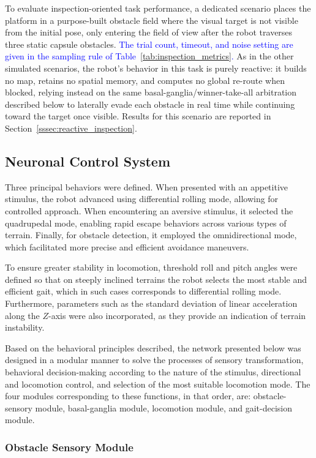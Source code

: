 \documentclass[preprint,12pt]{elsarticle}
\newcommand{\revblue}[1]{\textcolor{blue}{#1}}
\begin{document}
To evaluate inspection-oriented task performance, a dedicated scenario places the platform in a purpose-built obstacle field where the visual target is not visible from the initial pose, only entering the field of view after the robot traverses three static capsule obstacles. \revblue{The trial count, timeout, and noise setting are given in the sampling rule of Table~\ref{tab:inspection_metrics}.} As in the other simulated scenarios, the robot's behavior in this task is purely reactive: it builds no map, retains no spatial memory, and computes no global re-route when blocked, relying instead on the same basal-ganglia/winner-take-all arbitration described below to laterally evade each obstacle in real time while continuing toward the target once visible. Results for this scenario are reported in Section~\ref{sssec:reactive_inspection}.

\subsection{Neuronal Control System}

Three principal behaviors were defined. When presented with an appetitive stimulus, the robot advanced using differential rolling mode, allowing for controlled approach. When encountering an aversive stimulus, it selected the quadrupedal mode, enabling rapid escape behaviors across various types of terrain. Finally, for obstacle detection, it employed the omnidirectional mode, which facilitated more precise and efficient avoidance maneuvers. 

To ensure greater stability in locomotion, threshold roll and pitch angles were defined so that on steeply inclined terrains the robot selects the most stable and efficient gait, which in such cases corresponds to differential rolling mode. Furthermore, parameters such as the standard deviation of linear acceleration along the $Z$-axis were also incorporated, as they provide an indication of terrain instability.  

Based on the behavioral principles described, the network presented below was designed in a modular manner to solve the processes of sensory transformation, behavioral decision-making according to the nature of the stimulus, directional and locomotion control, and selection of the most suitable locomotion mode. The four modules corresponding to these functions, in that order, are: obstacle-sensory module, basal-ganglia module, locomotion module, and gait-decision module. 

\subsubsection{Obstacle Sensory Module}
\end{document}
